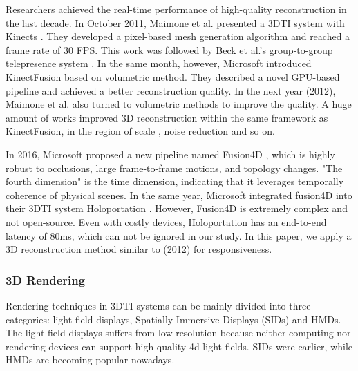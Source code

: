 Researchers achieved the real-time performance of high-quality reconstruction in the last decade. In October 2011, Maimone et al. presented a 3DTI system with Kinects \cite{maimone2011encumbrance}. They developed a pixel-based mesh generation algorithm and reached a frame rate of 30 FPS. This work was followed by Beck et al.'s group-to-group telepresence system \cite{beck2013immersive}. In the same month, however, Microsoft introduced KinectFusion \cite{izadi2011kinectfusion} based on volumetric method. They described a novel GPU-based pipeline and achieved a better reconstruction quality. In the next year (2012), Maimone et al. also turned to volumetric methods \cite{maimone2012real} to improve the quality. A huge amount of works improved 3D reconstruction within the same framework as KinectFusion, in the region of scale \cite{niessner2013real, chen2013scalable}, noise reduction \cite{khoshelham2012accuracy, nguyen2012modeling, newcombe2015dynamicfusion} and so on.

In 2016, Microsoft proposed a new pipeline named Fusion4D \cite{dou2016fusion4d}, which is highly robust to occlusions, large frame-to-frame motions, and topology changes. "The fourth dimension" is the time dimension, indicating that it leverages temporally coherence of physical scenes. In the same year, Microsoft integrated fusion4D into their 3DTI system Holoportation \cite{orts2016holoportation}. However, Fusion4D is extremely complex and not open-source. Even with costly devices, Holoportation has an end-to-end latency of 80ms, which can not be ignored in our study. In this paper, we apply a 3D reconstruction method similar to \cite{maimone2012real} (2012) for responsiveness.

\subsubsection{3D Rendering}

Rendering techniques in 3DTI systems can be mainly divided into three categories: light field displays, Spatially Immersive Displays (SIDs) and HMDs. The light field displays \cite{jones2007rendering, jurik2011prototyping, kim2012telehuman, gotsch2018telehuman2} suffers from low resolution because neither computing nor rendering devices can support high-quality 4d light fields. SIDs were earlier, while HMDs are becoming popular nowadays.

